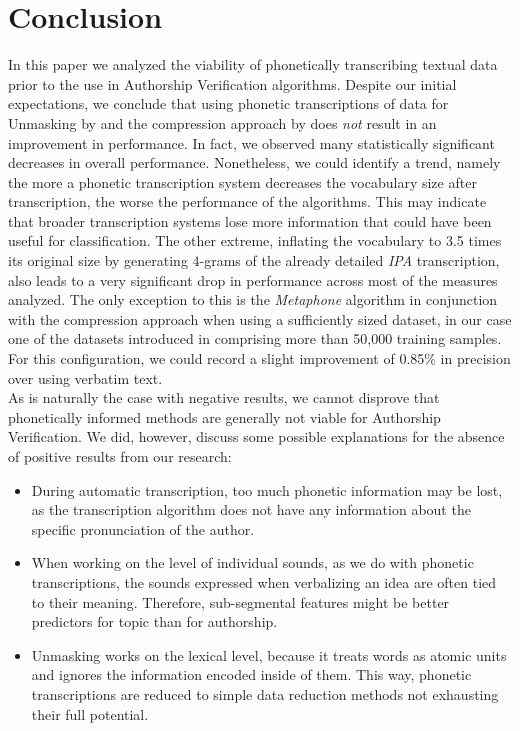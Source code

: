 \chapter{Conclusion}\label{conclusion}
In this paper we analyzed the viability of phonetically transcribing textual data prior to the use in Authorship Verification algorithms.
Despite our initial expectations, we conclude that using phonetic transcriptions of data for Unmasking by \cite{koppel2004unmasking} and the compression approach by \cite{teahan2003compression} does \textit{not} result in an improvement in performance.
In fact, we observed many statistically significant decreases in overall performance.
Nonetheless, we could identify a trend, namely the more a phonetic transcription system decreases the vocabulary size after transcription, the worse the performance of the algorithms.
This may indicate that broader transcription systems lose more information that could have been useful for classification.
The other extreme, inflating the vocabulary to 3.5 times its original size by generating $4$-grams of the already detailed \textit{IPA} transcription, also leads to a very significant drop in performance across most of the measures analyzed.
The only exception to this is the \textit{Metaphone} algorithm in conjunction with the compression approach when using a sufficiently sized dataset, in our case one of the datasets introduced in \cite{bevendorff2020overview} comprising more than 50,000 training samples.
For this configuration, we could record a slight improvement of 0.85\% in precision over using verbatim text.\\
As is naturally the case with negative results, we cannot disprove that phonetically informed methods are generally not viable for Authorship Verification.
We did, however, discuss some possible explanations for the absence of positive results from our research:
\begin{itemize}
    \item During automatic transcription, too much phonetic information may be lost, as the transcription algorithm does not have any information about the specific pronunciation of the author.
    \item When working on the level of individual sounds, as we do with phonetic transcriptions, the sounds expressed when verbalizing an idea are often tied to their meaning. Therefore, sub-segmental features might be better predictors for topic than for authorship.
    \item Unmasking works on the lexical level, because it treats words as atomic units and ignores the information encoded inside of them. This way, phonetic transcriptions are reduced to simple data reduction methods not exhausting their full potential.
\end{itemize}
